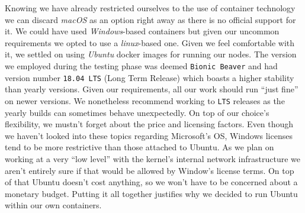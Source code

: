             Knowing we have already restricted ourselves to the use of container technology we can discard \textit{macOS} as an option right away as there is no official support for it. We could have used \textit{Windows}-based containers but given our uncommon requirements we opted to use a \textit{linux}-based one. Given we feel comfortable with it, we settled on using \textit{Ubuntu} docker images for running our nodes. The version we employed during the testing phase was deemed \texttt{Bionic Beaver} and had version number \texttt{18.04 LTS} (Long Term Release) which boasts a higher stability than yearly versions. Given our requirements, all our work should run ``just fine'' on newer versions. We nonetheless recommend working to \texttt{LTS} releases as the yearly builds can sometimes behave unexpectedly. On top of our choice's flexibility, we mustn't forget about the price and licensing factors. Even though we haven't looked into these topics regarding Microsoft's OS, Windows licenses tend to be more restrictive than those attached to Ubuntu. As we plan on working at a very ``low level'' with the kernel's internal network infrastructure we aren't entirely sure if that would be allowed by Window's license terms. On top of that Ubuntu doesn't cost anything, so we won't have to be concerned about a monetary budget. Putting it all together justifies why we decided to run Ubuntu within our own containers.
